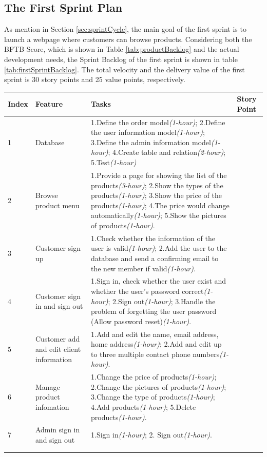 \documentclass{report}
\begin{document}
\subsection{The First Sprint Plan}
As mention in Section \ref{sec:sprintCycle}, the main goal of the first sprint is to launch a webpage where customers can browse products. Considering both the BFTB Score, which is shown in Table \ref{tab:productBacklog} and the actual development needs, the Sprint Backlog of the first sprint is shown in table \ref{tab:firstSprintBacklog}. The total velocity and the delivery value of the first sprint is 30 story points and 25 value points, respectively. 
\\
\begin{tabularx}{0.95\linewidth}{%
  l%
  >{\raggedright\arraybackslash}p{2cm}%
  >{\raggedright\arraybackslash}X%
  >{\raggedright\arraybackslash}p{1cm}}
  \toprule
  Index & Feature & Tasks & Story Point\\
  \midrule
  1 
  & Database 
  & 1.Define the order model\textit{(1-hour)}; 2.Define the user information model\textit{(1-hour)}; 3.Define the admin information model\textit{(1-hour)}; 4.Create table and relation\textit{(2-hour)}; 5.Test\textit{(1-hour)}
  & 8
  \\
  \midrule
  2 
  & Browse product menu
  & 1.Provide a page for showing the list of the products\textit{(3-hour)}; 2.Show the types of the products\textit{(1-hour)}; 3.Show the price of the products\textit{(1-hour)}; 4.The price would change automatically\textit{(1-hour)}; 5.Show the pictures of products\textit{(1-hour)}.
  & 8
  \\
  \midrule
  3
  & Customer sign up
  & 1.Check whether the information of the user is valid\textit{(1-hour)}; 2.Add the user to the database and send a confirming email to the new member if valid\textit{(1-hour)}.
  & 2
  \\
  \midrule
  4
  & Customer sign in and sign out
  & 1.Sign in, check whether the user exist and whether the user's password correct\textit{(1-hour)}; 2.Sign out\textit{(1-hour)}; 3.Handle the problem of forgetting the user password (Allow password reset)\textit{(1-hour)}.
  & 3
  \\
  \midrule
  5
  & Customer add and edit client information
  & 1.Add and edit the name, email address, home address\textit{(1-hour)}; 2.Add and edit up to three multiple contact phone numbers\textit{(1-hour)}.
  & 2
  \\
  \midrule
  6
  & Manage product infomation
  & 1.Change the price of products\textit{(1-hour)}; 2.Change the pictures of products\textit{(1-hour)}; 3.Change the type of products\textit{(1-hour)}; 4.Add products\textit{(1-hour)}; 5.Delete products\textit{(1-hour)}.
  & 5
  \\
  \midrule
  7
  & Admin sign in and sign out
  & 1.Sign in\textit{(1-hour)}; 2. Sign out\textit{(1-hour)}.
  & 2
  \\
  \bottomrule
  \\
  \caption{The first Sprint Backlog (4.27 - 5.8)}  
  \label{tab:firstSprintBacklog}
\end{tabularx}
\end{document}
